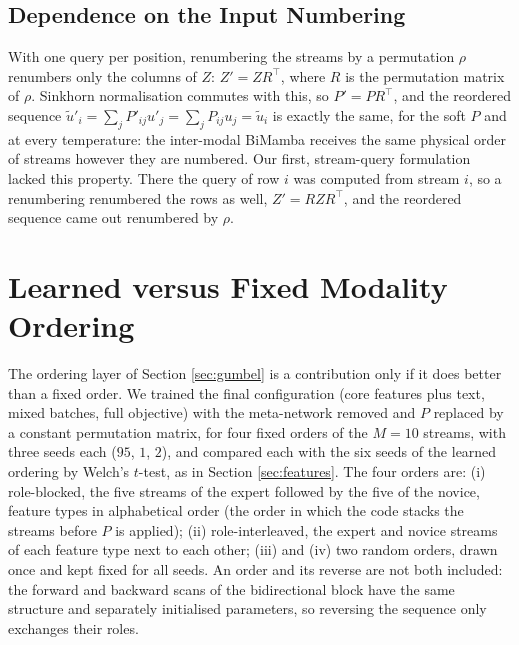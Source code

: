 \documentclass[10pt,a4paper,twocolumn]{article}
\begin{document}
	\subsection*{Dependence on the Input Numbering}
	With one query per position, renumbering the streams by a permutation $\rho$ renumbers only the columns of $Z$: $Z' = Z R^\top$, where $R$ is the permutation matrix of $\rho$. Sinkhorn normalisation commutes with this, so $P' = P R^\top$, and the reordered sequence $\tilde{u}'_i = \sum_j P'_{ij} u'_j = \sum_j P_{ij} u_j = \tilde{u}_i$ is exactly the same, for the soft $P$ and at every temperature: the inter-modal BiMamba receives the same physical order of streams however they are numbered. Our first, stream-query formulation lacked this property. There the query of row $i$ was computed from stream $i$, so a renumbering renumbered the rows as well, $Z' = R Z R^\top$, and the reordered sequence came out renumbered by $\rho$.


	\section{Learned versus Fixed Modality Ordering}
	\label{sec:fixedorder}
	The ordering layer of Section \ref{sec:gumbel} is a contribution only if it does better than a fixed order. We trained the final configuration (core features plus text, mixed batches, full objective) with the meta-network removed and $P$ replaced by a constant permutation matrix, for four fixed orders of the $M = 10$ streams, with three seeds each ($95$, $1$, $2$), and compared each with the six seeds of the learned ordering by Welch's $t$-test, as in Section \ref{sec:features}. The four orders are: (i) role-blocked, the five streams of the expert followed by the five of the novice, feature types in alphabetical order (the order in which the code stacks the streams before $P$ is applied); (ii) role-interleaved, the expert and novice streams of each feature type next to each other; (iii) and (iv) two random orders, drawn once and kept fixed for all seeds. An order and its reverse are not both included: the forward and backward scans of the bidirectional block have the same structure and separately initialised parameters, so reversing the sequence only exchanges their roles.
	
\end{document}
